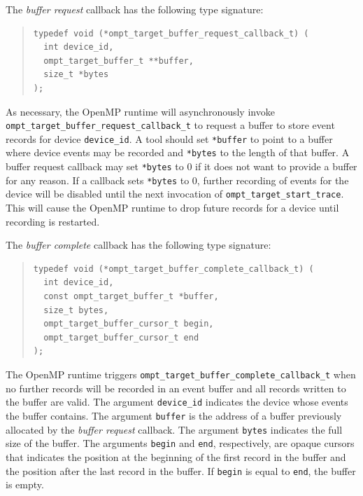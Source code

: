 \documentclass{article}
\begin{document}
The \emph{buffer request} callback has the following type signature:
\begin{quote}
\begin{verbatim}
typedef void (*ompt_target_buffer_request_callback_t) (
  int device_id,
  ompt_target_buffer_t **buffer,
  size_t *bytes
);
\end{verbatim}
\end{quote}
As necessary, the OpenMP runtime will asynchronously invoke \verb|ompt_target_buffer_request_callback_t| to request a buffer to store event records for device \verb|device_id|.
A tool should set \verb|*buffer| to point to a buffer where device events may be recorded and \verb|*bytes| to the length of that buffer.
A buffer request callback  may set \verb|*bytes| to 0 if it does not want to provide a buffer for any reason. If a callback sets \verb|*bytes| to 0, further recording of events for the device will be disabled until the next invocation of \verb|ompt_target_start_trace|. This will cause the OpenMP runtime to drop future records for a device until recording is restarted.

The \emph{buffer complete} callback has the following type signature: 
\begin{quote}
\begin{verbatim}
typedef void (*ompt_target_buffer_complete_callback_t) (
  int device_id, 
  const ompt_target_buffer_t *buffer,
  size_t bytes,
  ompt_target_buffer_cursor_t begin,
  ompt_target_buffer_cursor_t end
);
\end{verbatim}
\end{quote}
The OpenMP runtime triggers \verb|ompt_target_buffer_complete_callback_t| when no further records will be recorded in an event buffer and all records written to the buffer are valid. 
The argument \verb|device_id| indicates the device whose events the buffer contains. The argument \verb|buffer| is the address of a buffer previously allocated by the \emph{buffer request} callback. The argument \verb|bytes| indicates the full size of the buffer. The arguments \verb|begin| and \verb|end|, respectively, are opaque cursors that indicates the position at the beginning of the first record in the buffer and the position after the last record in the buffer. If \verb|begin| is equal to \verb|end|, the buffer is empty. 
\end{document}
